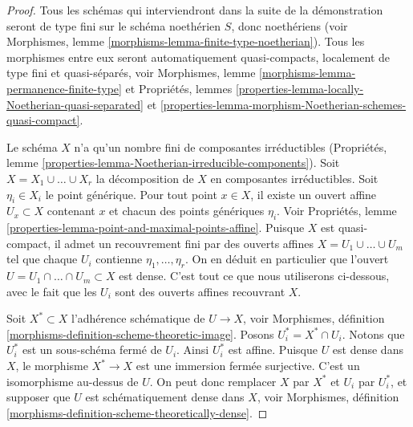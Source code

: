 \begin{proof}
Tous les schémas qui interviendront dans la suite de la
démonstration seront de type fini sur le schéma noethérien $S$,
donc noethériens
(voir Morphismes, lemme \ref{morphisms-lemma-finite-type-noetherian}).
Tous les morphismes entre eux seront automatiquement quasi-compacts, localement de
type fini et quasi-séparés, voir
Morphismes, lemme \ref{morphisms-lemma-permanence-finite-type} et
Propriétés,
lemmes \ref{properties-lemma-locally-Noetherian-quasi-separated} et
\ref{properties-lemma-morphism-Noetherian-schemes-quasi-compact}.

\medskip\noindent
Le schéma $X$ n'a qu'un nombre fini de composantes irréductibles
(Propriétés, lemme \ref{properties-lemma-Noetherian-irreducible-components}).
Soit $X = X_1 \cup \ldots \cup X_r$ la décomposition
de $X$ en composantes irréductibles.
Soit $\eta_i \in X_i$ le point générique.
Pour tout point $x \in X$, il existe un ouvert affine
$U_x \subset X$ contenant $x$ et chacun des points
génériques $\eta_i$. Voir
Propriétés, lemme \ref{properties-lemma-point-and-maximal-points-affine}.
Puisque $X$ est quasi-compact, il admet un recouvrement fini par des ouverts
affines $X = U_1 \cup \ldots \cup U_m$ tel que
chaque $U_i$ contienne $\eta_1, \ldots, \eta_r$.
On en déduit en particulier que l'ouvert
$U = U_1 \cap \ldots \cap U_m \subset X$ est
dense. C'est tout ce que nous utiliserons ci-dessous, avec le fait que les $U_i$ sont des ouverts affines
recouvrant $X$.

\medskip\noindent
Soit $X^* \subset X$ l'adhérence schématique de $U \to X$, voir
Morphismes, définition \ref{morphisms-definition-scheme-theoretic-image}.
Posons $U_i^* = X^* \cap U_i$. Notons que $U_i^*$ est un sous-schéma fermé
de $U_i$. Ainsi $U_i^*$ est affine. Puisque $U$ est dense dans $X$, le
morphisme $X^* \to X$ est une immersion fermée surjective. C'est un isomorphisme
au-dessus de $U$. On peut donc remplacer $X$ par $X^*$ et
$U_i$ par $U_i^*$, et supposer que $U$ est schématiquement dense
dans $X$, voir
Morphismes, définition \ref{morphisms-definition-scheme-theoretically-dense}.


\end{proof}
